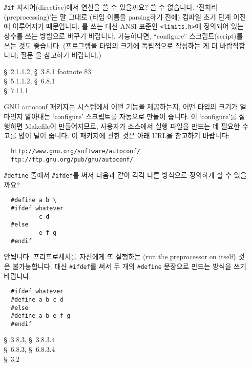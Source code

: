 \begin{faq}
	\verb+#if+ 지시어(directive)에서  연산을
	쓸 수 있을까요?
\A
	쓸 수 없습니다.  `전처리(preprocessing)'는 말 그대로 (타입 이름을
	parsing하기 전에) 컴파일 초기 단계 이전에 이루어지기
	때문입니다.  를 쓰는 대신 ANSI 표준인 \verb+<limits.h>+에
	정의되어 있는 상수를 쓰는 방법으로 바꾸기 바랍니다.
	가능하다면, ``configure'' 스크립트(script)를 쓰는 것도 좋습니다.
	(프로그램을 타입의 크기에 독립적으로 작성하는 게 더 바람직합니다;
        질문 을 참고하기 바랍니다.)

\R
	\cite{ansi} \S\ 2.1.1.2, \S\ 3.8.1 footnote 83 \\
	\cite{c89} \S\ 5.1.1.2, \S\ 6.8.1 \\
	\cite{hs} \S\ 7.11.1 
\T

	GNU autoconf 패키지는 시스템에서 어떤 기능을 제공하는지,
	어떤 타입의 크기가 얼마인지 알아내는 `configure' 스크립트를
	자동으로 만들어 줍니다.  이 `configure'를 실행하면
	Makefile이 만들어지므로, 사용자가 소스에서 실행 파일을 만드는
	데 필요한 수고를 많이 덜어 줍니다.
	이 패키지에 관한 것은 아래 URL을 참고하기 바랍니다:

\begin{verbatim}
  http://www.gnu.org/software/autoconf/
  ftp://ftp.gnu.org/pub/gnu/autoconf/
\end{verbatim}

\end{faq}

\begin{faq}
	\verb+#define+ 줄에서 \verb+#ifdef+를 써서 다음과 같이
        각각 다른 방식으로 정의하게 할 수 있을까요?
\begin{verbatim}
  #define a b \
  #ifdef whatever
          c d
  #else
          e f g
  #endif
\end{verbatim}

\A
	안됩니다.  
	프리프로세서를 자신에게 또 실행하는 (run the preprocessor on itself)
	것은 불가능합니다.  대신 \verb+#ifdef+를 써서 두 개의 \verb+#define+
	문장으로 만드는 방식을 쓰기 바랍니다:
\begin{verbatim}
  #ifdef whatever
  #define a b c d
  #else
  #define a b e f g
  #endif
\end{verbatim}

\R
	\cite{ansi} \S\ 3.8.3, \S\ 3.8.3.4 \\
	\cite{c89} \S\ 6.8.3, \S\ 6.8.3.4 \\
	\cite{hs} \S\ 3.2 
\end{faq}

